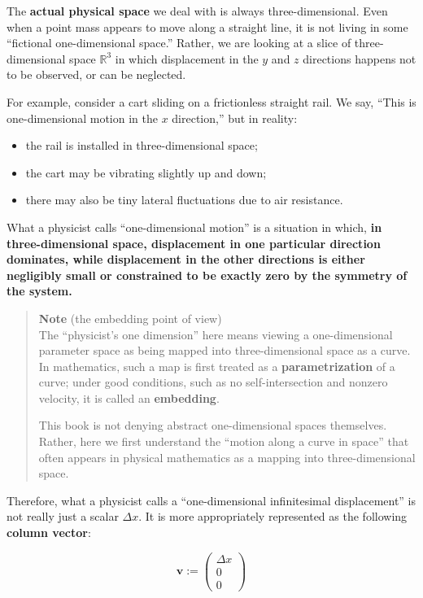 The \textbf{actual physical space} we deal with is always
three-dimensional. Even when a point mass appears to move along a
straight line, it is not living in some ``fictional one-dimensional
space.'' Rather, we are looking at a slice of three-dimensional space
\(\mathbb{R}^3\) in which displacement in the \(y\) and \(z\) directions
happens not to be observed, or can be neglected.

For example, consider a cart sliding on a frictionless straight rail. We
say, ``This is one-dimensional motion in the \(x\) direction,'' but in
reality:

\begin{itemize}
\item
  the rail is installed in three-dimensional space;
\item
  the cart may be vibrating slightly up and down;
\item
  there may also be tiny lateral fluctuations due to air resistance.
\end{itemize}

What a physicist calls ``one-dimensional motion'' is a situation in
which,
\textbf{in three-dimensional space, displacement in one particular direction dominates, while displacement in the other directions is either negligibly small or constrained to be exactly zero by the symmetry of the system.}

\begin{quote}
\textbf{Note} (the embedding point of view)\\
The ``physicist's one dimension'' here means viewing a one-dimensional
parameter space as being mapped into three-dimensional space as a curve.
In mathematics, such a map is first treated as a
\textbf{parametrization} of a curve; under good conditions, such as no
self-intersection and nonzero velocity, it is called an
\textbf{embedding}.

This book is not denying abstract one-dimensional spaces themselves.
Rather, here we first understand the ``motion along a curve in space''
that often appears in physical mathematics as a mapping into
three-dimensional space.
\end{quote}

Therefore, what a physicist calls a ``one-dimensional infinitesimal
displacement'' is not really just a scalar \(\Delta x\). It is more
appropriately represented as the following \textbf{column vector}:

\[
\mathbf{v} :=
\begin{pmatrix}
\Delta x \\
0 \\
0
\end{pmatrix}
\]

